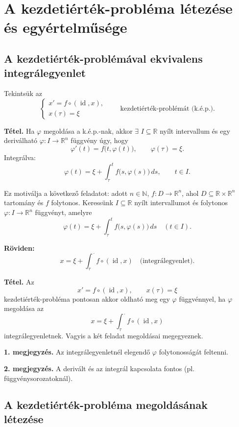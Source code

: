 \graphicspath{{lectures/03_eloadas_abrak/}}

\section{A kezdetiérték-probléma létezése és egyértelműsége}

\subsection{A kezdetiérték-problémával ekvivalens integrálegyenlet}

Tekintsük az
\[
 \begin{cases}
   x'=f\circ(\operatorname{id},x),\\
   x(\tau)=\xi
 \end{cases}
 \qquad\text{kezdetiérték-problémát (k.é.p.).}
\]

\noindent\textbf{Tétel.} Ha $\varphi$ megoldása a k.é.p.-nak, akkor $\exists$
$I\subseteq\mathbb R$ nyílt intervallum és egy deriválható
$\varphi:I\to\mathbb R^n$ függvény úgy, hogy
\[
 \varphi'(t)=f\bigl(t,\varphi(t)\bigr),\qquad
 \varphi(\tau)=\xi.
\]
Integrálva:
\[
 \boxed{\displaystyle
 \varphi(t)=\xi+\int_\tau^t f\bigl(s,\varphi(s)\bigr)\,ds},
 \qquad t\in I.
\]

Ez motiválja a következő feladatot: adott $n\in\mathbb N$,
$f:D\to\mathbb R^n$, ahol $D\subseteq\mathbb R\times\mathbb R^n$
tartomány és $f$ folytonos. Keressünk $I\subseteq\mathbb R$
nyílt intervallumot és folytonos $\varphi:I\to\mathbb R^n$
függvényt, amelyre
\[
 \varphi(t)=\xi+\int_\tau^t f\bigl(s,\varphi(s)\bigr)\,ds
 \quad(t\in I).
\]

\noindent\textbf{Röviden:}
\[
 \boxed{\displaystyle x=\xi+\int_\tau^{\,\cdot}
                   f\circ(\operatorname{id},x)}
 \quad\text{(integrálegyenlet).}
\]

\noindent\textbf{Tétel.} Az
\[
  x'=f\circ(\operatorname{id},x),\qquad x(\tau)=\xi
\]
kezdetiérték-probléma pontosan akkor oldható meg egy $\varphi$ függvénnyel,
ha $\varphi$ megoldása az
\[
  x=\xi+\int_\tau^{\,\cdot}f\circ(\operatorname{id},x)
\]
integrálegyenletnek. Vagyis a két feladat megoldásai megegyeznek.

\noindent\textbf{1. megjegyzés.} Az integrálegyenletnél elegendő
$\varphi$ folytonosságát feltenni.

\noindent\textbf{2. megjegyzés.} A derivált és az integrál kapcsolata fontos
(pl. függvénysorozatoknál).

\subsection{A kezdetiérték-probléma megoldásának létezése}

